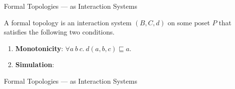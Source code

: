 \documentclass[xcolor={dvipsnames}]{beamer}
\begin{document}
\begin{frame}{Formal Topologies --- as Interaction Systems}
  \large

  A \alert{formal topology} is an interaction system $(B, C, d)$ on some poset $P$ that
  satisfies the following two conditions.

  \begin{enumerate}
    \item \textbf{Monotonicity}: $\forall a~b~c.~d(a, b, c) \sqsubseteq a$.
    \item \textbf{Simulation}:
  \end{enumerate}
\end{frame}

\begin{frame}{Formal Topologies --- as Interaction Systems}
\end{frame}
\end{document}
